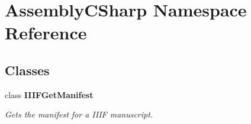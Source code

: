 \section{Assembly\+C\+Sharp Namespace Reference}
\label{namespace_assembly_c_sharp}
\subsection*{Classes}
\begin{DoxyCompactItemize}
\item 
class {\bf I\+I\+I\+F\+Get\+Manifest}
\begin{DoxyCompactList}\small\item\em Gets the manifest for a I\+I\+IF manuscript. \end{DoxyCompactList}\end{DoxyCompactItemize}
